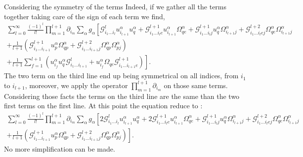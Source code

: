 {Considering the symmetry of the terms 
Indeed, if we gather all the terms together taking care of the sign of each term we find, 
\begin{multline*}
    \sum_{l=0}^\infty
        \frac{(-1)^l}{l!}
        \prod^{l+1}_{m=1} \partial_{i_m}
        \sum_\alpha  g_\alpha
        \left[
            \mathcal{G}_{i_1\ldots i_l}^l u^\alpha_{i_{l+1}} u^\alpha_q
            +\mathcal{G}_{i_1\ldots i_l e}^{l+1} u^\alpha_{i_{l+1}}\Omega_{qe}^\alpha
            +\mathcal{G}_{i_1\ldots i_l j}^{l+1} u^\alpha_q\Omega_{i_{l+1}j}^\alpha
            +\mathcal{G}_{i_1\ldots i_l ej}^{l+2}\Omega_{qe}^\alpha \Omega_{i_{l+1}j}^\alpha
            \phantom{\sum^{l+1}_l}
        \right.\\
            +\frac{1}{l+1}
            \left(
                \mathcal{G}_{i_1\ldots i_{l+1}}^{l+1}u_p^\alpha \Omega^\alpha_{qp}     
                +\mathcal{G}_{i_1\ldots i_{l+1}j}^{l+2}\Omega_{qp}^\alpha \Omega_{pj}^\alpha
            \right)
        \\
        \left.
            +\frac{1}{l+1}
            \sum_{f=1}^{l+1}
            \left(
                u^\alpha_{i_f}
                u_q^\alpha 
                \mathcal{G}_{i_1\ldots i_{l+1}}^l
                +u_{i_f}^\alpha \Omega_{qe} 
                \mathcal{G}_{i_1\ldots i_{l+1}e}^{l+1}
            \right)
        \right].
\end{multline*}
The two term on the third line end up being symmetrical on all indices, from $i_1$ to $i_{l+1}$, moreover, we apply the operator $\prod^{l+1}_{m=1} \partial_{i_m}$ on those same terms.
Considering those facts the terms on the third line are the same than the two first terms on the first line. 
At this point the equation reduce to :
\begin{multline*}
    \sum_{l=0}^\infty
        \frac{(-1)^l}{l!}
        \prod^{l+1}_{m=1} \partial_{i_m}
        \sum_\alpha  g_\alpha
        \left[
            2\mathcal{G}_{i_1\ldots i_l}^l u^\alpha_{i_{l+1}} u^\alpha_q
            +2\mathcal{G}_{i_1\ldots i_l e}^{l+1} u^\alpha_{i_{l+1}}\Omega_{qe}^\alpha
            +\mathcal{G}_{i_1\ldots i_l j}^{l+1} u^\alpha_q\Omega_{i_{l+1}j}^\alpha
            +\mathcal{G}_{i_1\ldots i_l ej}^{l+2}\Omega_{qe}^\alpha \Omega_{i_{l+1}j}^\alpha
        \right.\\
        \left.
            +\frac{1}{l+1}
            \left(
                \mathcal{G}_{i_1\ldots i_{l+1}}^{l+1}u_p^\alpha \Omega^\alpha_{qp}     
                +\mathcal{G}_{i_1\ldots i_{l+1}j}^{l+2}\Omega_{qp}^\alpha \Omega_{pj}^\alpha
            \right)
        \right].
\end{multline*}
No more simplification can be made. 

}
